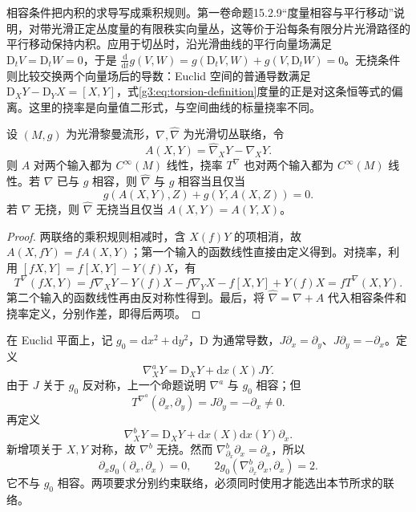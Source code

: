 相容条件把内积的求导写成乘积规则。第一卷命题15.2.9“度量相容与平行移动”说明，对带光滑正定丛度量的有限秩实向量丛，这等价于沿每条有限分片光滑路径的平行移动保持内积。应用于切丛时，沿光滑曲线的平行向量场满足 \(\mathrm{D}_tV=\mathrm{D}_tW=0\)，于是 \(\frac{\mathrm{d}}{\mathrm{d}t}g(V,W)=g(\mathrm{D}_tV,W)+g(V,\mathrm{D}_tW)=0\)。无挠条件则比较交换两个向量场后的导数：Euclid 空间的普通导数满足 \(\mathrm{D}_XY-\mathrm{D}_YX=[X,Y]\)，式\eqref{g3:eq:torsion-definition}度量的正是对这条恒等式的偏离。这里的挠率是向量值二形式，与空间曲线的标量挠率不同。

\begin{proposition}\label{g3:prop:connection-difference-conditions}
	设 \((M,g)\) 为光滑黎曼流形，\(\nabla,\widehat\nabla\) 为光滑切丛联络，令
	\[
		A(X,Y)=\widehat\nabla_XY-\nabla_XY.
	\]
	则 \(A\) 对两个输入都为 \(C^\infty(M)\) 线性，挠率 \(T^\nabla\) 也对两个输入都为 \(C^\infty(M)\) 线性。若 \(\nabla\) 已与 \(g\) 相容，则 \(\widehat\nabla\) 与 \(g\) 相容当且仅当
	\[
		g(A(X,Y),Z)+g(Y,A(X,Z))=0.
	\]
	若 \(\nabla\) 无挠，则 \(\widehat\nabla\) 无挠当且仅当 \(A(X,Y)=A(Y,X)\)。
\end{proposition}
\begin{proof}
	两联络的乘积规则相减时，含 \(X(f)Y\) 的项相消，故 \(A(X,fY)=fA(X,Y)\)；第一个输入的函数线性直接由定义得到。对挠率，利用 \([fX,Y]=f[X,Y]-Y(f)X\)，有
	\[
		T^\nabla(fX,Y)
		=f\nabla_XY-Y(f)X-f\nabla_YX-f[X,Y]+Y(f)X
		=fT^\nabla(X,Y).
	\]
	第二个输入的函数线性再由反对称性得到。最后，将 \(\widehat\nabla=\nabla+A\) 代入相容条件和挠率定义，分别作差，即得后两项。
\end{proof}

\begin{example}\label{g3:exm:compatibility-torsion-independent}
	在 Euclid 平面上，记 \(g_0=\mathrm{d}x^2+\mathrm{d}y^2\)，\(\mathrm{D}\) 为通常导数，\(J\partial_x=\partial_y\)、\(J\partial_y=-\partial_x\)。定义
	\[
		\nabla^a_XY=\mathrm{D}_XY+\mathrm{d}x(X)JY.
	\]
	由于 \(J\) 关于 \(g_0\) 反对称，上一个命题说明 \(\nabla^a\) 与 \(g_0\) 相容；但
	\[
		T^{\nabla^a}(\partial_x,\partial_y)=J\partial_y=-\partial_x\ne0.
	\]
	再定义
	\[
		\nabla^b_XY=\mathrm{D}_XY+\mathrm{d}x(X)\mathrm{d}x(Y)\partial_x.
	\]
	新增项关于 \(X,Y\) 对称，故 \(\nabla^b\) 无挠。然而 \(\nabla^b_{\partial_x}\partial_x=\partial_x\)，所以
	\[
		\partial_xg_0(\partial_x,\partial_x)=0,
		\qquad
		2g_0(\nabla^b_{\partial_x}\partial_x,\partial_x)=2.
	\]
	它不与 \(g_0\) 相容。两项要求分别约束联络，必须同时使用才能选出本节所求的联络。
\end{example}

